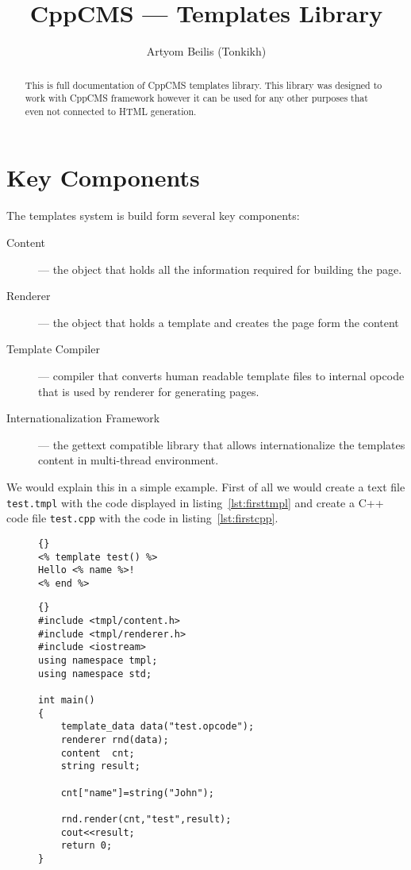 \documentclass{article}
\title{CppCMS --- Templates Library}
\author{Artyom Beilis (Tonkikh)}
\newcommand{\tw}[1]{\texttt{#1}}
\begin{document}
\maketitle
\tableofcontents
\lstlistoflistings
\begin{abstract}
This is full documentation of CppCMS templates library. This library was designed to work with CppCMS framework however
it can be used for any other purposes that even not connected to HTML generation.
\end{abstract}
\section{Key Components}
The templates system is build form several key components:
\begin{description}
\item[Content] --- the object that holds all the information required for building the page.
\item[Renderer] --- the object that holds a template and creates the page form the content
\item[Template Compiler] --- compiler that converts human readable template files to internal opcode that is used by renderer for generating pages.
\item[Internationalization Framework] --- the gettext compatible library that allows internationalize the templates content in multi-thread environment.
\end{description}

We would explain this in a simple example.
First of all we would create a text file \tw{test.tmpl} with the
code displayed in listing~\ref{lst:firsttmpl} and create a C++ code file \tw{test.cpp}
with the code in listing~\ref{lst:firstcpp}.

\begin{figure}
\begin{lstlisting}[label=lst:firsttmpl,caption=First Template]{}
<% template test() %>
Hello <% name %>!
<% end %>
\end{lstlisting}
\end{figure}


\begin{figure}
\begin{lstlisting}[label=lst:firstcpp,caption=Frist C++ Code]{}
#include <tmpl/content.h>
#include <tmpl/renderer.h>
#include <iostream>
using namespace tmpl;
using namespace std;

int main()
{
	template_data data("test.opcode");
	renderer rnd(data);
	content  cnt;
	string result;

	cnt["name"]=string("John");
	
	rnd.render(cnt,"test",result);
	cout<<result;
	return 0;
}
\end{lstlisting}
\end{figure}
\end{document}
